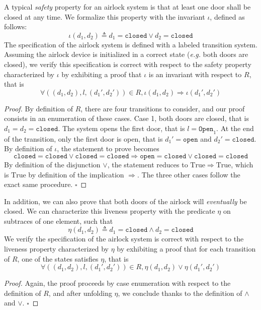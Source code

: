 \begin{example}
  A typical \emph{safety} property for an airlock system is that at least one
  door shall be closed at any time.
  We formalize this property with the invariant \( \iota \), defined as follows:
  \[
    \iota( d_1, d_2) \triangleq d_1 = \mathtt{closed} \vee d_2 = \mathtt{closed}
  \]
  The specification of the airlock system is defined with a labeled transition
  system.
  Assuming the airlock device is initialized in a correct state (\emph{e.g.}
  both doors are closed), we verify this specification is correct with respect
  to the safety property characterized by \( \iota \) by exhibiting a proof that
  \( \iota \) is an invariant with respect to \( R \), that is
  \[
    \forall ((d_1, d_2), l, (d_1', d_2')) \in R, \iota(d_1, d_2) \Rightarrow
    \iota(d_1', d_2')
  \]

  \begin{proof}
    By definition of \( R \), there are four transitions to consider, and our
    proof consists in an enumeration of these cases.
    Case 1, both doors are closed, that is \( d_1 = d_2 = \mathtt{closed} \).
    The system opens the first door, that is \( l = \mathtt{Open}_1 \). At the
    end of the transition, only the first door is open, that is
    \( d_1' = \mathtt{open} \) and \( d_2' = \mathtt{closed} \).
    By definition of \( \iota \), the statement to prove becomes
    \[
      \mathtt{closed} = \mathtt{closed} \vee \mathtt{closed} = \mathtt{closed}
      \Rightarrow \mathtt{open} = \mathtt{closed} \vee \mathtt{closed} =
      \mathtt{closed}
    \]
    By definition of the disjunction \( \vee \), the statement reduces to
    \( \mathrm{True} \Rightarrow \mathrm{True} \), which is \( \mathrm{True} \)
    by definition of the implication \( \Rightarrow \).
    The three other cases follow the exact same procedure.
    \hfill \( \square \)
  \end{proof}

  In addition, we can also prove that both doors of the airlock will
  \emph{eventually} be closed.
  We can characterize this liveness property with the predicate \( \eta \) on
  subtraces of one element, such that
  \[
    \eta(d_1, d_2) \triangleq d_1 = \mathtt{closed} \wedge d_2 = \mathtt{closed}
  \]
  We verify the specification of the airlock system is correct with respect to
  the liveness property characterized by \( \eta \) by exhibiting a proof that
  for each transition of \( R \), one of the states satisfies \( \eta \), that
  is
  \[
    \forall ((d_1, d_2), l, (d_1', d_2')) \in R, \eta(d_1, d_2) \vee \eta(d_1',
    d_2')
  \]

  \begin{proof}
    Again, the proof proceeds by case enumeration with respect to the definition
    of \( R \), and after unfolding \( \eta \), we conclude thanks to the
    definition of \( \wedge \) and \( \vee \).
    \hfill \( \square \)
  \end{proof}
\end{example}


